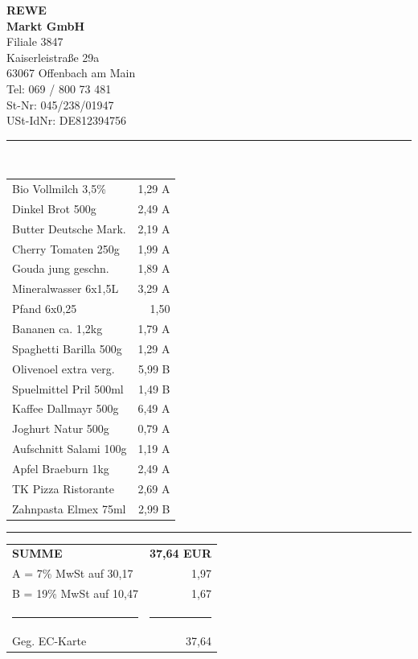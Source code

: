 \documentclass{article}
\begin{document}
{\centering
\textbf{\large REWE}\\
\textbf{Markt GmbH}\\[0.2cm]
Filiale 3847\\
Kaiserleistra\ss e 29a\\
63067 Offenbach am Main\\
Tel: 069 / 800 73 481\\[0.1cm]
St-Nr: 045/238/01947\\
USt-IdNr: DE812394756\\[0.2cm]
\rule{70mm}{0.4pt}\\[0.2cm]
}

\noindent
{\small
\begin{tabular}{@{}p{45mm}r@{}}
Bio Vollmilch 3,5\% & 1,29 A\\
Dinkel Brot 500g & 2,49 A\\
Butter Deutsche Mark. & 2,19 A\\
Cherry Tomaten 250g & 1,99 A\\
Gouda jung geschn. & 1,89 A\\
Mineralwasser 6x1,5L & 3,29 A\\
\quad Pfand 6x0,25 & 1,50\\
Bananen ca. 1,2kg & 1,79 A\\
Spaghetti Barilla 500g & 1,29 A\\
Olivenoel extra verg. & 5,99 B\\
Spuelmittel Pril 500ml & 1,49 B\\
Kaffee Dallmayr 500g & 6,49 A\\
Joghurt Natur 500g & 0,79 A\\
Aufschnitt Salami 100g & 1,19 A\\
Apfel Braeburn 1kg & 2,49 A\\
TK Pizza Ristorante & 2,69 A\\
Zahnpasta Elmex 75ml & 2,99 B\\
\end{tabular}
}

\vspace{0.2cm}
\rule{70mm}{0.4pt}

\noindent
{\small
\begin{tabular}{@{}lr@{}}
\textbf{SUMME} & \textbf{37,64 EUR}\\[0.1cm]
A = 7\% MwSt auf 30,17 & 1,97\\
B = 19\% MwSt auf 10,47 & 1,67\\[0.1cm]
\rule{45mm}{0.4pt} & \rule{20mm}{0.4pt}\\
Geg. EC-Karte & 37,64\\
\end{tabular}
}
\end{document}
